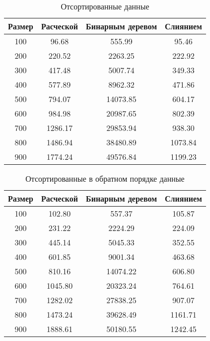 \begin{table}[h]
	\begin{center}
		\begin{threeparttable}
		\captionsetup{singlelinecheck=off}
		\caption{Отсортированные данные}
		\label{tbl:best}
		\begin{tabular}{|c|c|c|c|}
			\hline
			Размер & Расческой & Бинарным деревом & Слиянием \\
			\hline
			  100 & 96.68 & 555.99 & 95.46 \\ 
			\hline
			200 & 220.52 & 2263.25 & 222.92 \\ 
			\hline
			300 & 417.48 & 5007.74 & 349.33 \\ 
			\hline
			400 & 577.89 & 8962.32 & 471.86 \\ 
			\hline
			500 & 794.07 & 14073.85 & 604.17 \\ 
			\hline
			600 & 984.98 & 20987.65 & 802.39 \\ 
			\hline
			700 & 1286.17 & 29853.94 & 938.30 \\ 
			\hline
			800 & 1486.94 & 38480.89 & 1073.84 \\ 
			\hline
			900 & 1774.24 & 49576.84 & 1199.23 \\ 
			\hline
		\end{tabular}
		\end{threeparttable}
    \end{center}
\end{table}

\begin{table}[h]
	\begin{center}
		\begin{threeparttable}
		\captionsetup{singlelinecheck=off}
		\caption{Отсортированные в обратном порядке данные}
		\label{tbl:worth}
		\begin{tabular}{|c|c|c|c|}
			\hline
			 Размер & Расческой & Бинарным деревом & Слиянием \\
			\hline
			  100 & 102.80 & 557.37 & 105.87 \\ 
			\hline
			200 & 231.22 & 2224.29 & 224.09 \\ 
			\hline
			300 & 445.14 & 5045.33 & 352.55 \\ 
			\hline
			400 & 601.85 & 9001.34 & 463.68 \\ 
			\hline
			500 & 810.16 & 14074.22 & 606.80 \\ 
			\hline
			600 & 1045.80 & 20323.24 & 764.61 \\ 
			\hline
			700 & 1282.02 & 27838.25 & 907.07 \\ 
			\hline
			800 & 1473.24 & 39628.49 & 1161.71 \\ 
			\hline
			900 & 1888.61 & 50180.55 & 1242.45 \\ 
			\hline
		\end{tabular}
		\end{threeparttable}
    \end{center}
\end{table}

